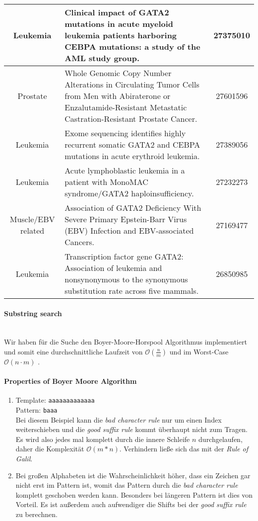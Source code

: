 \documentclass[a4paper,10pt]{article}
\begin{document}
\begin{itemize}
\begin{tabular}[t]{|c|p{10.5cm}|c|}
			\hline 
			Leukemia & Clinical impact of GATA2 mutations in acute myeloid leukemia patients harboring CEBPA mutations: a study of the AML study group. & 27375010 \\ 
			\hline 
			Prostate & Whole Genomic Copy Number Alterations in Circulating Tumor Cells from Men with Abiraterone or Enzalutamide-Resistant Metastatic Castration-Resistant Prostate Cancer. & 27601596 \\ 
			\hline 
			Leukemia & Exome sequencing identifies highly recurrent somatic GATA2 and CEBPA mutations in acute erythroid leukemia. & 27389056 \\ 
			\hline 
			Leukemia & Acute lymphoblastic leukemia in a patient with MonoMAC syndrome/GATA2 haploinsufficiency. & 27232273 \\ 
			\hline 
			Muscle/EBV related & Association of GATA2 Deficiency With Severe Primary Epstein-Barr Virus (EBV) Infection and EBV-associated Cancers. & 27169477 \\ 
			\hline 
			Leukemia & Transcription factor gene GATA2: Association of leukemia and nonsynonymous to the synonymous substitution rate across five mammals. & 26850985 \\ 
			\hline 
		\end{tabular} 
	\end{itemize}
	
	\paragraph{Substring search}\ \\
	Wir haben für die Suche den Boyer-Moore-Horspool Algorithmus implementiert und somit eine durchschnittliche Laufzeit von $\mathcal{O}(\frac{n}{m})$ und im Worst-Case $\mathcal{O}(n \cdot m)$ .

	\paragraph{Properties of Boyer Moore Algorithm}
	\begin{enumerate}
		\item Template: \verb|aaaaaaaaaaaaa|\\
		Pattern: \verb|baaa|\\
		Bei diesem Beispiel kann die \textit{bad character rule} nur um einen Index weiterschieben und die \textit{good suffix rule} kommt überhaupt nicht zum Tragen. Es wird also jedes mal komplett durch die innere Schleife $n$ durchgelaufen, daher die Komplexität $\mathcal{O}(m*n)$. Verhindern ließe sich das mit der \textit{Rule of Galil}.
		\item Bei großen Alphabeten ist die Wahrscheinlichkeit höher, dass ein Zeichen gar nicht erst im Pattern ist, womit das Pattern durch die \textit{bad character rule} komplett geschoben werden kann. Besonders bei längeren Pattern ist dies von Vorteil. Es ist außerdem auch aufwendiger  die Shifts bei der \textit{good suffix rule} zu berechnen.
		
	\end{enumerate}
\end{document}
